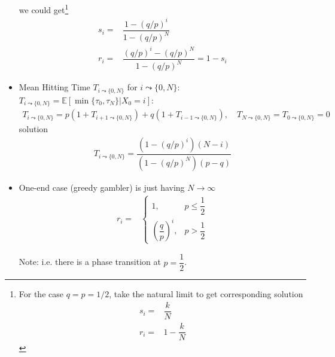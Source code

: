 \begin{itemize}[topsep=2pt,itemsep=0pt]
    we could get\footnote{For the case $ q=p=1/2 $, take the natural limit to get corresponding solution
    \begin{align*}
        s_i=&\dfrac{k}{N}\\
        r_i=&1-\dfrac{k}{N}
    \end{align*}
    }
    \begin{align*}
        s_i=&\dfrac{1-(q/p)^i}{1-(q/p)^N}\\
        r_i=&\dfrac{(q/p)^i-(q/p)^N}{1-(q/p)^N}=1-s_i
    \end{align*}
    \item Mean Hitting Time $ T_{i\leadsto \{0,N\}} $ for $ i\leadsto \{0,N\} $: $ T_{i\leadsto \{0,N\}}=\mathbb{E}\left[ \min\{\tau_{0},\tau_{N}\}|X_0=i \right]  $:
    \begin{align*}
        T_{i\leadsto \{0,N\}}= p\left(1+T_{i+1\leadsto \{0,N\}}\right) + q\left(1+T_{i-1\leadsto \{0,N\}}\right),\quad T_{N\leadsto \{0,N\}}=T_{0\leadsto \{0,N\}}=0
    \end{align*}
    solution
\begin{align*}
    T_{i\leadsto\{0,N\}}=\dfrac{\left(1-(q/p)^i\right)(N-i)}{\left(1-(q/p)^N\right)(p-q)} 
\end{align*}
    \item One-end case (greedy gambler) is just having $ N\to\infty $
    \begin{align*}
        r_i=&\begin{cases}
            1,&p\leq \dfrac{1}{2}\\
            \left(\dfrac{q}{p}\right)^i,&p>\dfrac{1}{2}
        \end{cases} 
    \end{align*}
    
    Note: i.e. there is a phase transition at $ p=\dfrac{1}{2} $.

\end{itemize}







